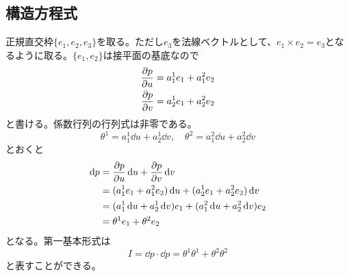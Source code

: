 \subsection{構造方程式}
    正規直交枠$\{e_1, e_2, e_3\}$を取る。ただし$e_3$を法線ベクトルとして、$e_1 \times e_2 = e_3$となるように取る。$\{e_1, e_2\}$は接平面の基底なので
    \begin{align*}
        \pdv{p}{u} &= a^1_1e_1 + a^2_1e_2\\
        \pdv{p}{v} &= a^1_2e_1 + a^2_2e_2
    \end{align*}
    と書ける。係数行列の行列式は非零である。
        \[\theta^1 = a^1_1\dd{u} + a^1_2\dd{v}, \quad \theta^2 = a^2_1\dd{u} + a^2_2\dd{v}\]
    とおくと
    \begin{align*}
        \dd{p} &= \pdv{p}{u}\dd{u} + \pdv{p}{v}\dd{v}\\
                &= (a^1_1e_1 + a^2_1e_2)\dd{u} + (a^1_2e_1 + a^2_2e_2)\dd{v}\\
                &= (a^1_1\dd{u} + a^1_2\dd{v})e_1 + (a^2_1\dd{u} + a^2_2\dd{v})e_2\\
                &= \theta^1e_1 + \theta^2e_2
    \end{align*}
    となる。第一基本形式は
        \[I = \dd{p} \cdot \dd{p} = \theta^1\theta^1 + \theta^2\theta^2\]
    と表すことができる。

